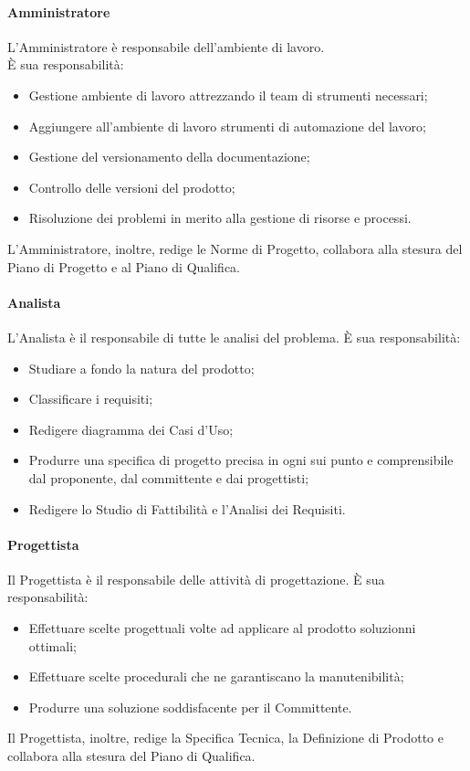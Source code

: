         \paragraph{Amministratore}
          L'Amministratore è responsabile dell'ambiente di lavoro.\\
          È sua responsabilità:
          \begin{itemize}
            \item Gestione ambiente di lavoro attrezzando il team di strumenti necessari;
            \item Aggiungere all’ambiente di lavoro strumenti di automazione del lavoro;
            \item Gestione del versionamento della documentazione;
            \item Controllo delle versioni del prodotto;
            \item Risoluzione dei problemi in merito alla gestione di risorse e processi.
          \end{itemize}
          L'Amministratore, inoltre, redige le Norme di Progetto, collabora alla stesura del Piano di Progetto e al Piano di Qualifica.
        \paragraph{Analista}
          L'Analista è il responsabile di tutte le analisi del problema.
          È sua responsabilità:
          \begin{itemize}
            \item Studiare a fondo la natura del prodotto;
            \item Classificare i requisiti;
            \item Redigere diagramma dei Casi d'Uso;
            \item Produrre una specifica di progetto precisa in ogni sui punto e comprensibile dal proponente, dal committente e dai progettisti;
            \item Redigere lo Studio di Fattibilità e l'Analisi dei Requisiti.
          \end{itemize}
        \paragraph{Progettista}
          Il Progettista è il responsabile delle attività di progettazione.
          È sua responsabilità:
          \begin{itemize}
            \item Effettuare scelte progettuali volte ad applicare al prodotto soluzionni ottimali;
            \item Effettuare scelte procedurali che ne garantiscano la manutenibilità;
            \item Produrre una soluzione soddisfacente per il Committente.
          \end{itemize}
          Il Progettista, inoltre, redige la Specifica Tecnica, la Definizione di Prodotto e collabora alla stesura del Piano di Qualifica.
